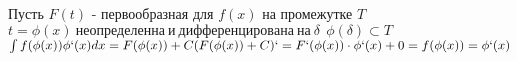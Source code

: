  \\
 \\
Пусть $F(t)$ - первообразная для $f(x)$ на промежутке $T$ \\
$t = \phi (x) ~ неопределенна ~ и ~ дифференцирована ~ на ~ \delta ~~ \phi
(\delta) \subset T$ \\
$\int f(\phi (x)) \phi`(x)dx = F(\phi (x)) + C \\
(F(\phi(x)) + C)` = F`(\phi (x)) \cdot \phi`(x) + 0 = f(\phi(x)) = \phi`(x)$ \\

